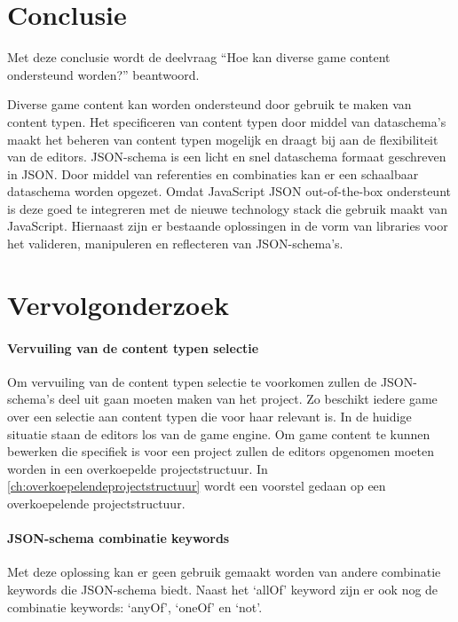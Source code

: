 \pagebreak

\section{Conclusie}
Met deze conclusie wordt de deelvraag “Hoe kan diverse game content ondersteund worden?” beantwoord.

Diverse game content kan worden ondersteund door gebruik te maken van content typen. Het specificeren van content typen door middel van dataschema’s maakt het beheren van content typen mogelijk en draagt bij aan de flexibiliteit van de editors. JSON-schema is een licht en snel dataschema formaat geschreven in JSON. Door middel van referenties en combinaties kan er een schaalbaar dataschema worden opgezet. Omdat JavaScript JSON out-of-the-box ondersteunt is deze goed te integreren met de nieuwe technology stack die gebruik maakt van JavaScript. Hiernaast zijn er bestaande oplossingen in de vorm van libraries voor het valideren, manipuleren en reflecteren van JSON-schema’s.

\section{Vervolgonderzoek}
\paragraph{Vervuiling van de content typen selectie}
Om vervuiling van de content typen selectie te voorkomen zullen de JSON-schema’s deel uit gaan moeten maken van het project. Zo beschikt iedere game over een selectie aan content typen die voor haar relevant is. In de huidige situatie staan de editors los van de game engine. Om game content te kunnen bewerken die specifiek is voor een project zullen de editors opgenomen moeten worden in een overkoepelde projectstructuur. In \autoref{ch:overkoepelendeprojectstructuur} wordt een voorstel gedaan op een overkoepelende projectstructuur.

\paragraph{JSON-schema combinatie keywords}
Met deze oplossing kan er geen gebruik gemaakt worden van andere combinatie keywords die JSON-schema biedt. Naast het ‘allOf’ keyword zijn er ook nog de combinatie keywords: ‘anyOf’, ‘oneOf’ en ‘not’.